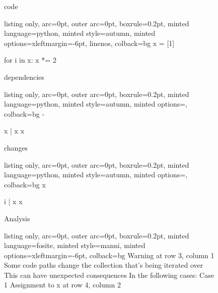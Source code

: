 \begin{figure}[!h]
 \begin{minipage}{0.32\textwidth}
 code
 \vspace{2pt}
  \begin{tcblisting}{listing only, 
    arc=0pt,
    outer arc=0pt, 
    boxrule=0.2pt,
    minted language=python,
    minted style=autumn,
    minted options={xleftmargin=-6pt, linenos},
    colback=bg }
x = [1]

for i in x:
  x *= 2
\end{tcblisting}
 \end{minipage}
 \begin{minipage}{0.32\textwidth}
 dependencies
  \begin{tcblisting}{listing only, 
    arc=0pt,
    outer arc=0pt, 
    boxrule=0.2pt,
    minted language=python,
    minted style=autumn,
    minted options={},
    colback=bg }
- 

x | x
    x
\end{tcblisting}
 \end{minipage}
 \begin{minipage}{0.32\textwidth}
 changes
  \begin{tcblisting}{listing only, 
    arc=0pt,
    outer arc=0pt, 
    boxrule=0.2pt,
    minted language=python,
    minted style=autumn,
    minted options={},
    colback=bg }
x

i | x
    x
\end{tcblisting}
 \end{minipage}
 \begin{minipage}{\textwidth}
  \vspace{4pt}
  Analysis
  \begin{tcblisting}{listing only, 
    arc=0pt,
    outer arc=0pt, 
    boxrule=0.2pt,
    minted language=fosite,
    minted style=manni,
    minted options={xleftmargin=-6pt},
    colback=bg }
Warning at row 3, column 1
  Some code paths change the collection that's being iterated over
  This can have unexpected consequences
  In the following cases:
  Case 1
    Assignment to x at row 4, column 2

\end{tcblisting}
 \end{minipage}
 \label{lst:endless3}
\end{figure}